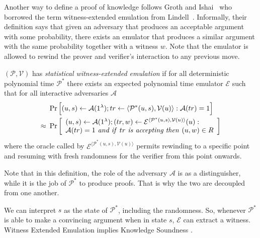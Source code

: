 Another way to define a proof of knowledge follows Groth and Ishai~\cite{GrI08} who borrowed the term witness-extended emulation from Lindell~\cite{Lin03}. Informally, their definition says that given an adversary that produces an acceptable argument with some probability, there exists an emulator that produces a similar argument with the same probability together with a witness $w$. Note that the emulator is allowed to rewind the prover and verifier's interaction to any previous move.

\begin{definition}
$(\mathcal{P},\mathcal{V})$ has {\em statistical witness-extended emulation} if for all deterministic polynomial time $\mathcal{P}^*$ there exists an expected polynomial time emulator $\mathcal{E}$ such that for all interactive adversaries $\mathcal{A}$
\begin{align*}
& \Pr \Big{[}(u,s) \leftarrow\mathcal{A}(1^{\lambda}); tr \leftarrow \langle \mathcal{P}^*(u,s), \mathcal{V}(u)\rangle: \mathcal{A}(tr)=1 \Big{]}\\
\approx \ & \Pr \left[ \begin{array}{l} (u,s) \leftarrow \mathcal{A}(1^{\lambda}); (tr,w) \leftarrow \mathcal{E}^{ \langle \mathcal{P}^*(u,s), \mathcal{V}(u) \rangle } (u): \\ \mathcal{A}(tr)=1 \text{\emph{ and if }} tr \text{\emph{ is accepting then }} (u,w) \in R \end{array} \right]
\end{align*}
where the oracle called by $\mathcal{E}^{\langle \mathcal{P}^*(u,s), \mathcal{V}(u)\rangle}$ permits rewinding to a specific point and resuming with fresh randomness for the verifier from this point onwards.
\end{definition}
\noindent
Note that in this definition, the role of the adversary $\mathcal{A}$ is as a distinguisher, while it is the job of $\mathcal{P}^*$ to produce proofs. That is why the two are decoupled from one another.

We can interpret $s$ as the state of $\mathcal{P}^*$, including the randomness. So, whenever $\mathcal{P}^*$ is able to make a convincing argument when in state $s$,  $\mathcal{E}$ can extract a witness. Witness Extended Emulation implies Knowledge Soundness \cite{dissertation}.

